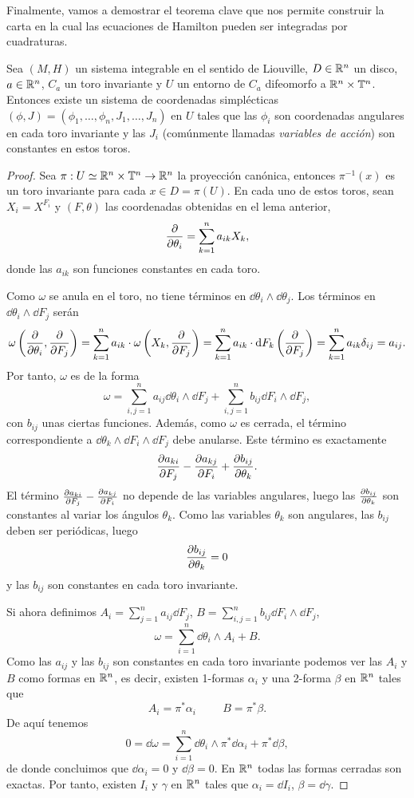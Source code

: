 Finalmente, vamos a demostrar el teorema clave que nos permite construir la carta en la cual las ecuaciones de Hamilton pueden ser integradas por cuadraturas.
\begin{thm}
  Sea $(M,H)$ un sistema integrable en el sentido de Liouville, $D \in \mathbb{R}^n$ un disco, $a \in \mathbb{R}^n$, $C_a$ un toro invariante y $U$ un entorno de $C_a$ difeomorfo a $\mathbb{R}^n \times \mathbb{T}^n$. Entonces existe un sistema de coordenadas simplécticas $(\phi,J)=(\phi_1,\dots,\phi_n,J_1,\dots,J_n)$ en $U$ tales que las $\phi_i$ son coordenadas angulares en cada toro invariante y las $J_i$ (comúnmente llamadas \emph{variables de acción}) son constantes en estos toros.
\end{thm}
\begin{proof}
  Sea $\pi:U\simeq \mathbb{R}^n \times \mathbb{T}^n \rightarrow \mathbb{R}^n$ la proyección canónica, entonces $\pi^{-1}(x)$ es un toro invariante para cada $x \in D=\pi(U)$. En cada uno de estos toros, sean $X_i=X^{F_i}$ y $(F,\theta)$ las coordenadas obtenidas en el lema anterior,
\[
  \frac{\partial}{\partial \theta_i} = \sum_{k=1}^n a_{ik}X_k,
\]
donde las $a_{ik}$ son funciones constantes en cada toro.

Como $\omega$ se anula en el toro, no tiene términos en $\dd \theta_i \wedge \dd \theta_j$. Los términos en $\dd \theta_i \wedge \dd F_j$ serán
\[
  \omega\left(\frac{\partial}{\partial \theta_i},\frac{\partial}{\partial F_j}\right)=\sum_{k=1}^n a_{ik}\cdot \omega\left(X_k,\frac{\partial}{\partial F_j}\right)=\sum_{k=1}^n a_{ik} \cdot \mathrm{d} F_k \left(\frac{\partial}{\partial F_j}\right) = \sum_{k=1}^n a_{ik} \delta_{ij}= a_{ij}. 
\]
Por tanto, $\omega$ es de la forma
\[
  \omega = \sum_{i,j=1}^n a_{ij} \dd \theta_i \wedge \dd F_j + \sum_{i,j=1}^n b_{ij} \dd F_i \wedge \dd F_j,
\]
con $b_{ij}$ unas ciertas funciones. Además, como $\omega$ es cerrada, el término correspondiente a $\dd \theta_k \wedge \dd F_i \wedge \dd F_j$ debe anularse. Este término es exactamente
\[
  \frac{\partial a_{ki}}{\partial F_j}-\frac{\partial a_{kj}}{\partial F_i}+\frac{\partial b_{ij}}{\partial \theta_k}.
\]
El término $\frac{\partial a_{ki}}{\partial F_j}-\frac{\partial a_{kj}}{\partial F_i}$ no depende de las variables angulares, luego las $\frac{\partial b_{ij}}{\partial \theta_k}$ son constantes al variar los ángulos $\theta_k$. Como las variables $\theta_k$ son angulares, las $b_{ij}$ deben ser periódicas, luego
\[
  \frac{\partial b_{ij}}{\partial \theta_k}=0
\]
y las $b_{ij}$ son constantes en cada toro invariante.

Si ahora definimos $A_i=\sum_{j=1}^n a_{ij}\dd F_j$, $B=\sum_{i,j=1}^n b_{ij}\dd F_i \wedge \dd F_j$,
\[
  \omega=\sum_{i=1}^n \dd \theta_i \wedge A_i + B.
\]
Como las $a_{ij}$ y las $b_{ij}$ son constantes en cada toro invariante podemos ver las $A_i$ y $B$ como formas en $\mathbb{R}^n$, es decir, existen 1-formas $\alpha_i$ y una 2-forma $\beta$ en $\mathbb{R}^n$ tales que
\[
  A_i= \pi^* \alpha_i \hspace{1cm} B=\pi^* \beta.
\]
De aquí tenemos
\[
  0=\dd \omega= \sum_{i=1}^n \dd \theta_i \wedge \pi^* \dd \alpha_i + \pi^* \dd \beta,
\]
de donde concluimos que $\dd \alpha_i = 0$ y $\dd \beta =0$. En $\mathbb{R}^n$ todas las formas cerradas son exactas. Por tanto, existen $I_i$ y $\gamma$ en $\mathbb{R}^n$ tales que $\alpha_i = \dd I_i$, $\beta= \dd \gamma$.


\end{proof}
